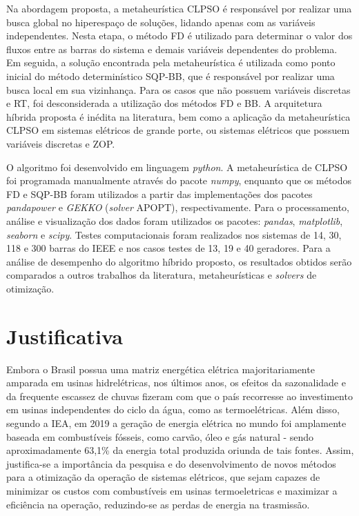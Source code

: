 \documentclass[
	12pt,				%
	openany,			%
	twoside,			%
	a4paper,			%
	chapter=TITLE,		%
	section=Title,		%
	subsection=Title,	%
	subsubsection=Title,%
	english,			%
	french,				%
	spanish,			%
	brazil			%
	]{abntex2}
\begin{document}
\begin{ERRATA}
Na abordagem proposta, a metaheurística CLPSO é responsável por realizar uma busca global no hiperespaço de soluções, lidando apenas com as variáveis independentes. Nesta etapa, o método FD é utilizado para determinar o valor dos fluxos entre as barras do sistema e demais variáveis dependentes do problema. Em seguida, a solução encontrada pela metaheurística é utilizada como ponto inicial do método determinístico SQP-BB, que é responsável por realizar uma busca local em sua vizinhança. Para os casos que não possuem variáveis discretas e RT, foi desconsiderada a utilização dos métodos FD e BB. A arquitetura híbrida proposta é inédita na literatura, bem como a aplicação da metaheurística CLPSO em sistemas elétricos de grande porte, ou sistemas elétricos que possuem variáveis discretas e ZOP. 

O algoritmo foi desenvolvido em linguagem \emph{python}. A metaheurística de CLPSO foi programada manualmente através do pacote \emph{numpy}, enquanto que os métodos FD e SQP-BB foram utilizados a partir das implementações dos pacotes \emph{pandapower} e \emph{GEKKO} (\emph{solver} APOPT), respectivamente. Para o processamento, análise e visualização dos dados foram utilizados os pacotes: \emph{pandas}, \emph{matplotlib}, \emph{seaborn} e \emph{scipy}. Testes computacionais foram realizados nos sistemas de 14, 30, 118 e 300 barras do IEEE e nos casos testes de 13, 19 e 40 geradores. Para a análise de desempenho do algoritmo híbrido proposto, os resultados obtidos serão comparados a outros trabalhos da literatura, metaheurísticas e \emph{solvers} de otimização.


\section{Justificativa}
Embora o Brasil possua uma matriz energética elétrica majoritariamente amparada em usinas hidrelétricas, nos últimos anos, os efeitos da sazonalidade e da frequente escassez de chuvas fizeram com que o país recorresse ao investimento em usinas independentes do ciclo da água, como as termoelétricas. Além disso, segundo a IEA, em 2019 a geração de energia elétrica no mundo foi amplamente baseada em combustíveis fósseis, como carvão, óleo e gás natural - sendo aproximadamente 63,1\% da energia total produzida  oriunda de tais fontes. Assim, justifica-se a importância da pesquisa e do desenvolvimento de novos métodos para a otimização da operação de sistemas elétricos, que sejam capazes de minimizar os custos com combustíveis em usinas termoeletricas e maximizar a eficiência na operação, reduzindo-se as perdas de energia na trasmissão.


\end{ERRATA}
\end{document}
